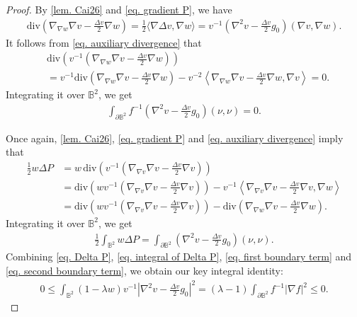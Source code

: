 \documentclass[11pt,a4paper,twoside]{amsart}
\newtheorem{sketch proof}{Sketch of the proof}[section]
\begin{document}
\begin{proof}
By \cref{lem. Cai26} and \cref{eq. gradient P}, we have
\begin{align}\label{eq. auxiliary divergence}
    \mathrm{div}\left(\nabla_{\nabla w}\nabla v-\frac{\Delta v}{2}\nabla w\right)
    =\frac{1}{2}\langle\nabla \Delta v,\nabla w\rangle
    =v^{-1}\left(
    \nabla^2 v-\frac{\Delta v}{2}g_0
    \right)(\nabla v,\nabla w).
\end{align}
It follows from \cref{eq. auxiliary divergence} that
\begin{align*}
    &\mathrm{div}
    \left(v^{-1}
    \left(\nabla_{\nabla w}\nabla v-\frac{\Delta v}{2}\nabla w\right)\right)\\
    &= v^{-1}\mathrm{div}\left(\nabla_{\nabla w}\nabla v-\frac{\Delta v}{2}\nabla w\right)
    -v^{-2}
    \left\langle
    \nabla_{\nabla w}\nabla v-\frac{\Delta v}{2}\nabla w,\nabla v
    \right\rangle=0.
\end{align*}
Integrating it over $\mathbb{B}^2$, we get
\begin{align}\label{eq. first boundary term}
    \int_{\partial\mathbb{B}^2}f^{-1}
    \left(
    \nabla^2 v-\frac{\Delta v}{2}g_0
    \right)(\nu,\nu)
    =0.
\end{align}

Once again, \cref{lem. Cai26}, \cref{eq. gradient P} and \cref{eq. auxiliary divergence} imply that
\begin{align*}
    \frac{1}{2}w\Delta P
    &= w\,\mathrm{div}
    \left(
    v^{-1}\left(
    \nabla_{\nabla v}\nabla v-\frac{\Delta v}{2}\nabla v
    \right)
    \right)\\[2mm]
    & = \mathrm{div}\left(wv^{-1}\left(
    \nabla_{\nabla v}\nabla v-\frac{\Delta v}{2}\nabla v
    \right)\right)
    -v^{-1}
    \left\langle
    \nabla_{\nabla v}\nabla v-\frac{\Delta v}{2}\nabla v,\nabla w
    \right\rangle\\[2mm]
    &= \mathrm{div}\left(wv^{-1}\left(
    \nabla_{\nabla v}\nabla v-\frac{\Delta v}{2}\nabla v
    \right)\right)
    -\mathrm{div}\left(\nabla_{\nabla w}\nabla v-\frac{\Delta v}{2}\nabla w\right).
\end{align*}
Integrating it over $\mathbb{B}^2$, we get
\begin{align}\label{eq. second boundary term}
    \frac{1}{2}\int_{\mathbb{B}^2}w\Delta P
     =\int_{\partial \mathbb{B}^2}
    \left(
    \nabla^2 v-\frac{\Delta v}{2}g_0
    \right)(\nu,\nu).
\end{align}
Combining \cref{eq. Delta P}, \cref{eq. integral of Delta P}, \cref{eq. first boundary term} and \cref{eq. second boundary term}, we obtain our key integral identity:
\begin{align}\label{eq. key integral identity}
    0\leq
    \int_{\mathbb{B}^2}(1-\lambda w)
    v^{-1}\left|
    \nabla^2 v-\frac{\Delta v}{2}g_0
    \right|^2
    =(\lambda-1)\int_{\partial\mathbb{B}^2}f^{-1}|\nabla f|^2\leq 0.
\end{align}
 

\end{proof}
\end{document}

